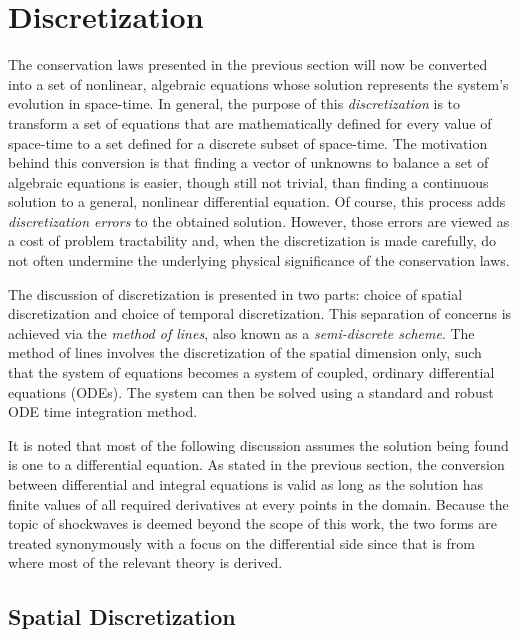 \documentclass[12pt]{../UWMadThesis}
\begin{document}
\chapter{Discretization}

The conservation laws presented in the previous section will now be converted into a set of nonlinear, algebraic equations whose solution represents the system's evolution in space-time.
In general, the purpose of this \textit{discretization} is to transform a set of equations that are mathematically defined for every value of space-time to a set defined for a discrete subset of space-time.
The motivation behind this conversion is that finding a vector of unknowns to balance a set of algebraic equations is easier, though still not trivial, than finding a continuous solution to a general, nonlinear differential equation.
Of course, this process adds \emph{discretization errors} to the obtained solution.
However, those errors are viewed as a cost of problem tractability and, when the discretization is made carefully, do not often undermine the underlying physical significance of the conservation laws.

The discussion of discretization is presented in two parts: choice of spatial discretization and choice of temporal discretization.
This separation of concerns is achieved via the \textit{method of lines}, also known as a \textit{semi-discrete scheme}.
The method of lines involves the discretization of the spatial dimension only, such that the system of equations becomes a system of coupled, ordinary differential equations (ODEs).
The system can then be solved using a standard and robust ODE time integration method.

It is noted that most of the following discussion assumes the solution being found is one to a differential equation.
As stated in the previous section, the conversion between differential and integral equations is valid as long as the solution has finite values of all required derivatives at every points in the domain.
Because the topic of shockwaves is deemed beyond the scope of this work, the two forms are treated synonymously with a focus on the differential side since that is from where most of the relevant theory is derived.


\section{Spatial Discretization}
\end{document}

